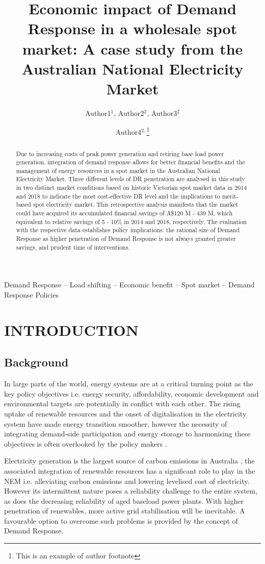 \documentclass{pasa}%
\title[title]{Economic impact of Demand Response in a wholesale spot market: A case study from the Australian National Electricity Market}
\author[Author1 et al.]{Author1$^1$, Author2$^2$, Author3$^2$ \and Author4$^{2,}$\thanks{This is an example of author footnote}\\
\affil{$^1$This is  an example of Affiliation for Author 1}%
\affil{$^2$This is  an example of Affiliation for Author 2}}%
\begin{document}
%
%
\begin{abstract}
Due to increasing costs of peak power generation and retiring base load power generation, integration of demand response allows for better financial benefits and the management of energy resources in a spot market in the Australian National Electricity Market. Three different levels of DR penetration are analysed in this study in two distinct market conditions based on historic Victorian spot market data in 2014 and 2018 to indicate the most cost-effective DR level and the implications to merit-based spot electricity market. This retrospective analysis manifests that the market could have acquired its accumulated financial savings of A\$120 M - 439 M, which equivalent to relative savings of 5 - 10\% in 2014 and 2018, respectively. The evaluation with the respective data establishes policy implications: the rational size of Demand Response as higher penetration of Demand Response is not always granted greater savings, and prudent time of interventions.

\end{abstract}
%
\begin{keywords}
Demand Response -- Load shifting -- Economic benefit -- Spot market -- Demand Response Policies
\end{keywords}
%
\maketitle%
%
\section{INTRODUCTION}
\label{sec:intro}
\subsection{Background}
In large parts of the world, energy systems are at a critical turning point as the key policy objectives i.e. energy security, affordability, economic development and environmental targets are potentially in conflict with each other. The rising uptake of renewable resources and the onset of digitalisation in the electricity system have made energy transition smoother, however the necessity of integrating demand-side participation and energy storage to harmonising these objectives is often overlooked by the policy makers \cite{crossley2011}.
 
Electricity generation is the largest source of carbon emissions in Australia \cite{finkel2017}, the associated integration of renewable resources has a significant role to play in the NEM i.e. alleviating carbon emissions and lowering levelised cost of electricity. However its intermittent nature poses a reliability challenge to the entire system, as does the decreasing reliability of aged baseload power plants. With higher penetration of renewables, more active grid stabilisation will be inevitable. A favourable option to overcome such problems is provided by the concept of Demand Response.
\end{document}

